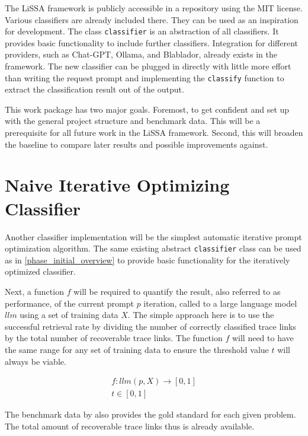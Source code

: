 The LiSSA framework is publicly accessible in a repository using the MIT license. Various classifiers are already included there.
They can be used as an inspiration for development.
The class \verb|classifier| is an abstraction of all classifiers.
It provides basic functionality to include further classifiers.
Integration for different \LLM providers, such as Chat-GPT, Ollama, and Blablador, already exists in the framework.
The new classifier can be plugged in directly with little more effort than writing the request prompt and implementing the \verb|classify| function to extract the classification result out of the \LLM output.

This work package has two major goals.
Foremost, to get confident and set up with the general project structure and benchmark data.
This will be a prerequisite for all future work in the LiSSA framework.
Second, this will broaden the baseline to compare later results and possible improvements against.




\section{Naive Iterative Optimizing Classifier}
\label{approach:sec:naive_iterative}
Another classifier implementation will be the simplest automatic iterative prompt optimization algorithm.
The same existing abstract \verb|classifier| class can be used as in \autoref{phase_initial_overview} to provide basic functionality for the iteratively optimized classifier.

Next, a function $f$ will be required to quantify the result, also referred to as performance, of the current prompt $p$ iteration, called to a large language model $llm$ using a set of training data $X$.
The simple approach here is to use the successful retrieval rate by dividing the number of correctly classified trace links by the total number of recoverable trace links.
The function $f$ will need to have the same range for any set of training data to ensure the threshold value $t$ will always be viable.

\begin{align}
        f: llm(p, X) \rightarrow [0, 1] \\
        t \in [0, 1]
\end{align}

The benchmark data by  also provides the gold standard for each given problem.
The total amount of recoverable trace links thus is already available. 

